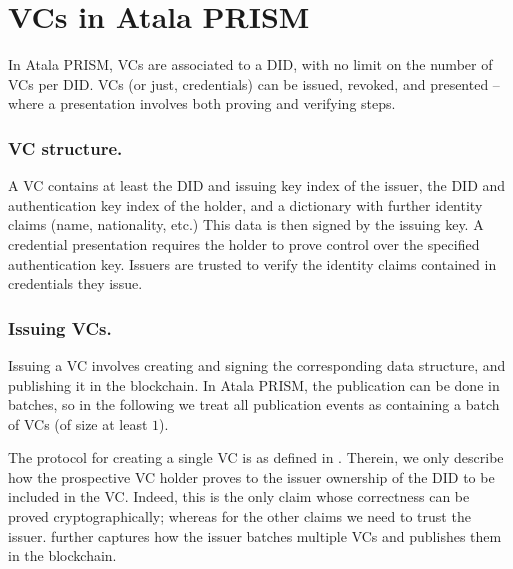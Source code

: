 \section{VCs in Atala PRISM}
\label{sec:vc-atala}

In Atala PRISM, VCs are associated to a DID, with no limit on the number of VCs
per DID. VCs (or just, credentials) can be issued, revoked, and presented --
where a presentation involves both proving and verifying steps.

\subsubsection{VC structure.}
A VC contains at least the DID and issuing key index of the issuer, the DID and
authentication key index of the holder, and a dictionary with further identity
claims (name, nationality, etc.) This data is then signed by the issuing key.
A credential presentation requires the holder to prove control over the
specified authentication key. Issuers are trusted to verify the identity
claims contained in credentials they issue.

\subsubsection{Issuing VCs.}
Issuing a VC involves creating and signing the corresponding data structure, and
publishing it in the blockchain. In Atala PRISM, the publication can be done in
batches, so in the following we treat all publication events as containing a
batch of VCs (of size at least $1$).

The protocol for creating a single VC is as defined in .
Therein, we only describe how the prospective VC holder proves to the issuer
ownership of the DID to be included in the VC. Indeed, this is the only
claim whose correctness can be proved cryptographically; whereas for the other
claims we need to trust the issuer.  further captures how
the issuer batches multiple VCs and publishes them in the blockchain.

